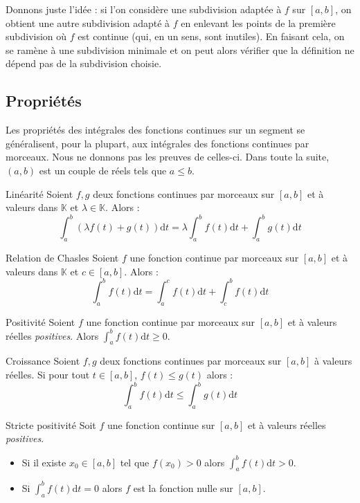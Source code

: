 \documentclass[french,11pt,twoside]{VcCours}
\newcommand{\dt}{\text{d}t}
\newcommand{\Int}[2]{\int_{#1}^{#2}}
\begin{document}
\begin{Demonstration}{} Donnons juste l'idée : si l'on considère une subdivision adaptée à $f$ sur $[a,b]$, on obtient une autre subdivision adapté à $f$ en \og enlevant \fg les points de la première subdivision où $f$ est continue (qui, en un sens, sont inutiles). En faisant cela, on se ramène à une subdivision \og minimale \fg et on peut alors vérifier que la définition ne dépend pas de la subdivision choisie.
\end{Demonstration}

\subsection{Propriétés}

Les propriétés des intégrales des fonctions continues sur un segment se généralisent, pour la plupart, aux intégrales des fonctions continues par morceaux. Nous ne donnons pas les preuves de celles-ci. Dans toute la suite, $(a,b)$ est un couple de réels tels que $a \leq b$.

\begin{Proposition}{Linéarité} Soient $f,g$ deux fonctions continues par morceaux sur $[a,b]$ et à valeurs dans $\mathbb{K}$ et $\lambda \in \mathbb{K}$. Alors :
$$ \int_{a}^b (\lambda f(t) + g(t)) \dt = \lambda \int_{a}^b  f(t) \dt +  \int_{a}^b  g(t) \dt$$
\end{Proposition}

\begin{Proposition}{Relation de Chasles} Soient $f$ une fonction continue par morceaux sur $[a,b]$ et à valeurs dans $\mathbb{K}$ et $c \in [a,b]$. Alors :
$$ \int_{a}^b f(t) \dt = \int_{a}^c f(t) \dt + \int_{c}^b f(t) \dt $$
\end{Proposition}

\begin{Proposition}{Positivité} Soient $f$ une fonction continue par morceaux sur $[a,b]$ et à valeurs réelles \emph{positives}. Alors $\Int{a}{b} f(t) \dt \geq 0$.
\end{Proposition}

\begin{Proposition}{Croissance} Soient $f,g$ deux fonctions continues par morceaux sur $[a,b]$ à valeurs réelles. Si pour tout $t \in [a,b]$, $f(t) \leq g(t)$ alors :
$$\int_{a}^{b} f(t) \dt  \leq \int_{a}^{b} g(t) \dt $$
\end{Proposition}

\begin{Proposition}{Stricte positivité}  Soit $f$ une fonction continue sur $[a,b]$ et à valeurs réelles \emph{positives}. 

\begin{itemize}
\item Si il existe $x_0 \in [a,b]$ tel que $f(x_0)>0$ alors $\Int{a}{b} f(t) \dt>0$.
\item Si $\Int{a}{b} f(t) \dt =0$ alors $f$ est la fonction nulle sur $[a,b]$.
\end{itemize}
\end{Proposition}
\end{document}
